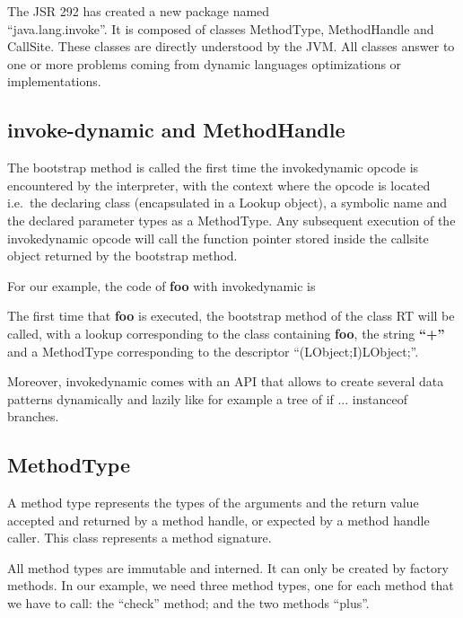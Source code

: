 \documentclass{sig-alternate}
\def \Jsr{JSR\xspace}
\def \JSR{\Jsr 292\xspace}
\def \JVM{JVM\xspace}
\begin{document}
      The \JSR has created a new package named\\ ``java.lang.invoke''.
      It is composed of classes MethodType, MethodHandle and CallSite.
      These classes are directly understood by the \JVM.
      All classes answer to one or more problems coming from dynamic languages optimizations or implementations.

    \subsection{invoke-dynamic and MethodHandle}

      The bootstrap method is called the first time the invokedynamic opcode is encountered by the interpreter,
      with the context where the opcode is located i.e.~the declaring class (encapsulated in a Lookup object),
      a symbolic name and the declared parameter types as a MethodType.
      Any subsequent execution of the invokedynamic opcode will call the function pointer
      stored inside the callsite object returned by the bootstrap method.
      
      For our example, the code of {\bf foo} with invokedynamic is

      

      The first time that {\bf foo} is executed, the bootstrap method of the class RT will be called, with a lookup corresponding to the class containing {\bf foo},
      the string {\bf ``+''} and a MethodType corresponding to the descriptor ``(LObject;I)LObject;''.%

      

      Moreover, invokedynamic comes with an API that allows to create several data patterns
      dynamically and lazily like for example a tree of if ... instanceof branches.

    \subsection{MethodType}

      A method type represents the types of the arguments and the return value accepted and returned by a method handle,
      or expected by a method handle caller.
      This class represents a method signature.

      

      All method types are immutable and interned.
      It can only be created by factory methods.
      In our example, we need three method types, one for each method that we have to call:
      the ``check'' method; and the two methods ``plus''.
\end{document}
